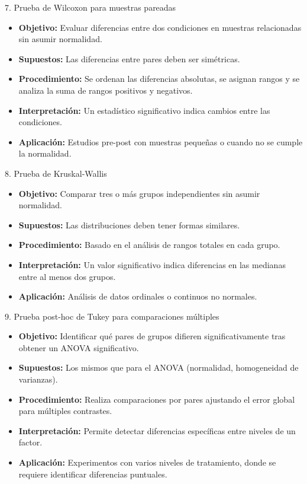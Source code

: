 ﻿\documentclass{beamer}
\begin{document}
\begin{frame}{7. Prueba de Wilcoxon para muestras pareadas}
\begin{itemize}
    \item \textbf{Objetivo:} Evaluar diferencias entre dos condiciones en muestras relacionadas sin asumir normalidad.
    \item \textbf{Supuestos:} Las diferencias entre pares deben ser simétricas.
    \item \textbf{Procedimiento:} Se ordenan las diferencias absolutas, se asignan rangos y se analiza la suma de rangos positivos y negativos.
    \item \textbf{Interpretación:} Un estadístico significativo indica cambios entre las condiciones.
    \item \textbf{Aplicación:} Estudios pre-post con muestras pequeñas o cuando no se cumple la normalidad.
\end{itemize}
\end{frame}

\begin{frame}{8. Prueba de Kruskal-Wallis}
\begin{itemize}
    \item \textbf{Objetivo:} Comparar tres o más grupos independientes sin asumir normalidad.
    \item \textbf{Supuestos:} Las distribuciones deben tener formas similares.
    \item \textbf{Procedimiento:} Basado en el análisis de rangos totales en cada grupo.
    \item \textbf{Interpretación:} Un valor significativo indica diferencias en las medianas entre al menos dos grupos.
    \item \textbf{Aplicación:} Análisis de datos ordinales o continuos no normales.
\end{itemize}
\end{frame}

\begin{frame}{9. Prueba post-hoc de Tukey para comparaciones múltiples}
\begin{itemize}
    \item \textbf{Objetivo:} Identificar qué pares de grupos difieren significativamente tras obtener un ANOVA significativo.
    \item \textbf{Supuestos:} Los mismos que para el ANOVA (normalidad, homogeneidad de varianzas).
    \item \textbf{Procedimiento:} Realiza comparaciones por pares ajustando el error global para múltiples contrastes.
    \item \textbf{Interpretación:} Permite detectar diferencias específicas entre niveles de un factor.
    \item \textbf{Aplicación:} Experimentos con varios niveles de tratamiento, donde se requiere identificar diferencias puntuales.
\end{itemize}
\end{frame}
\end{document}
